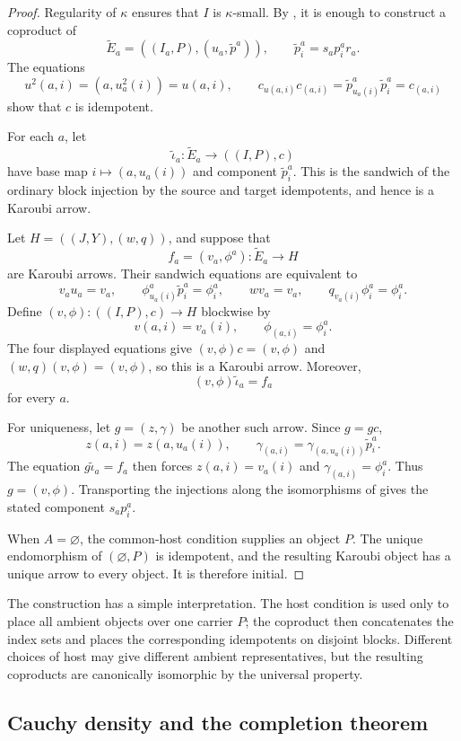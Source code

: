 \documentclass[runningheads,envcountsame]{llncs}
\begin{document}
\begin{proof}
Regularity of $\kappa$ ensures that $I$ is $\kappa$-small.  By
, it is enough to construct a coproduct of
$$
\widetilde E_a=((I_a,P),(u_a,\widetilde p^a)),
\qquad
\widetilde p^a_i=s_ap^a_ir_a.
$$
The equations
$$
u^2(a,i)=(a,u_a^2(i))=u(a,i),
\qquad
c_{u(a,i)}c_{(a,i)}
=
\widetilde p^a_{u_a(i)}\widetilde p^a_i
=
c_{(a,i)}
$$
show that $c$ is idempotent.

For each $a$, let
$$
\widetilde\iota_a:\widetilde E_a\longrightarrow((I,P),c)
$$
have base map $i\mapsto(a,u_a(i))$ and component $\widetilde p^a_i$.  This
is the sandwich of the ordinary block injection by the source and target
idempotents, and hence is a Karoubi arrow.

Let $H=((J,Y),(w,q))$, and suppose that
$$
f_a=(v_a,\phi^a):\widetilde E_a\longrightarrow H
$$
are Karoubi arrows.  Their sandwich equations are equivalent to
$$
v_au_a=v_a,
\qquad
\phi^a_{u_a(i)}\widetilde p^a_i=\phi^a_i,
\qquad
wv_a=v_a,
\qquad
q_{v_a(i)}\phi^a_i=\phi^a_i.
$$
Define $(v,\phi):((I,P),c)\to H$ blockwise by
$$
v(a,i)=v_a(i),
\qquad
\phi_{(a,i)}=\phi^a_i.
$$
The four displayed equations give $(v,\phi)c=(v,\phi)$ and
$(w,q)(v,\phi)=(v,\phi)$, so this is a Karoubi arrow.  Moreover,
$$
(v,\phi)\widetilde\iota_a=f_a
$$
for every $a$.

For uniqueness, let $g=(z,\gamma)$ be another such arrow.  Since $g=gc$,
$$
z(a,i)=z(a,u_a(i)),
\qquad
\gamma_{(a,i)}=
\gamma_{(a,u_a(i))}\widetilde p^a_i.
$$
The equation $g\widetilde\iota_a=f_a$ then forces
$z(a,i)=v_a(i)$ and $\gamma_{(a,i)}=\phi^a_i$.  Thus $g=(v,\phi)$.
Transporting the injections along the isomorphisms of
 gives the stated component $s_ap^a_i$.

When $A=\varnothing$, the common-host condition supplies an object $P$.
The unique endomorphism of $(\varnothing,P)$ is idempotent, and the resulting
Karoubi object has a unique arrow to every object.  It is therefore initial.
\end{proof}

The construction has a simple interpretation.  The host condition is used
only to place all ambient objects over one carrier $P$; the coproduct then
concatenates the index sets and places the corresponding idempotents on
disjoint blocks.  Different choices of host may give different ambient
representatives, but the resulting coproducts are canonically isomorphic by
the universal property.

\subsection{Cauchy density and the completion theorem}
\label{app:criterion-details}
\end{document}
